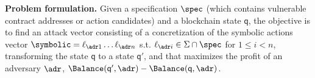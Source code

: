 


 
 
\noindent
\textbf{Problem formulation.}
Given a specification $\spec$ (which contains vulnerable contract addresses or action candidates) and a blockchain state $\mathsf{q}$, the objective is to find an attack vector consisting of a concretization of the symbolic actions vector $\symbolic = \ell_{\adr 1} \ldots \ell_{\adr n}$ s.t.  $\ell_{\adr i}\in \Sigma \cap \spec$  for $1\leq i<n$, transforming the state $\mathsf{q}$ to a state $\mathsf{q}'$, and that maximizes the profit of an adversary $\adr$, $\Balance(\mathsf{q}',\adr) -  \Balance(\mathsf{q},\adr)$. 


